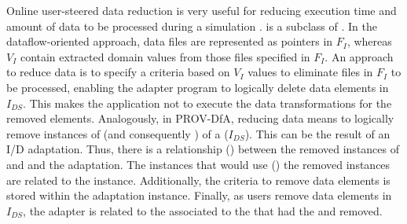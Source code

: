 Online user-steered data reduction is very useful for reducing execution time and amount of data to be processed during a simulation \cite{Souza2017Data}.
 is a subclass of .
In the dataflow-oriented approach, data files are represented as pointers in $F_I$,
whereas $V_I$ contain extracted domain values from those files specified in $F_I$.
An approach to reduce data is to specify a criteria based on $V_I$ values to eliminate files
in $F_I$ to be processed, enabling the adapter program to logically delete data elements in  $I_{DS}$. This makes the application not to execute the data transformations for the removed elements.
Analogously, in PROV-DfA, reducing data means to logically remove instances of  (and consequently ) of a  ($I_{DS}$).
This can be the result of an I/D adaptation.
Thus, there is a relationship () between the removed instances of 
and  and the adaptation. The  instances that would use () the removed  instances are related to the  instance. Additionally, the criteria to remove data elements is stored within the adaptation instance.
Finally, as users remove data elements in $I_{DS}$, the adapter is related to the  associated to the  that had the  and  removed.






